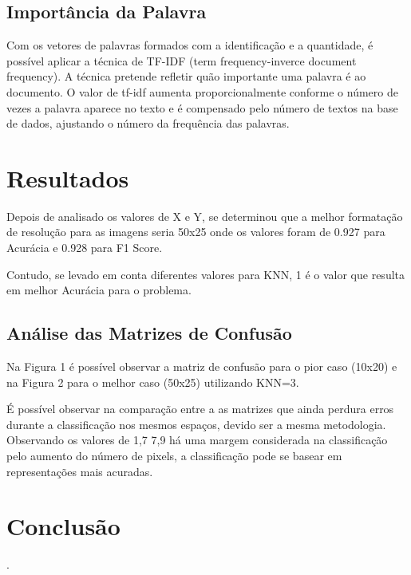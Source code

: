\documentclass[conference]{IEEEtran}
\begin{document}
\subsection{Importância da Palavra}

Com os vetores de palavras formados com a identificação e a quantidade, é possível aplicar a técnica de TF-IDF (term frequency-inverce document frequency). A técnica pretende refletir quão importante uma palavra é ao documento. O valor de tf-idf aumenta proporcionalmente conforme o número de vezes a palavra aparece no texto e é compensado pelo número de textos na base de dados, ajustando o número da frequência das palavras.

\section{Resultados}

Depois de analisado os valores de X e Y, se determinou que a melhor formatação de resolução para as imagens seria 50x25 onde os valores foram de 0.927 para Acurácia e 0.928 para F1 Score.

Contudo, se levado em conta diferentes valores para KNN, 1 é o valor que resulta em melhor Acurácia para o problema.

\subsection{Análise das Matrizes de Confusão}

Na Figura 1 é possível observar a matriz de confusão para o pior caso (10x20) e na Figura 2 para o melhor caso (50x25) utilizando KNN=3.

É possível observar na comparação entre a as matrizes que ainda perdura erros durante a classificação nos mesmos espaços, devido ser a mesma metodologia. Observando os valores de 1,7 7,9 há uma margem considerada na classificação pelo aumento do número de pixels, a classificação pode se basear em representações mais acuradas.

\section{Conclusão}

\cite{IEEEexample:confwithvolume}.



\end{document}
